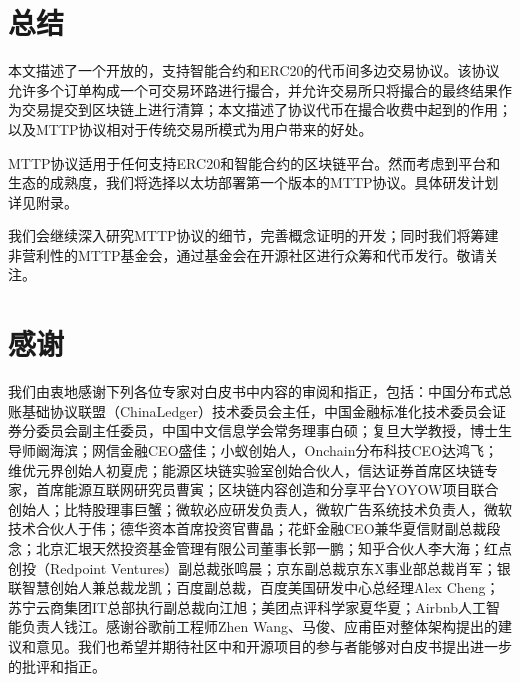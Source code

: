 \documentclass[UTF8,nofonts]{ctexart}
\begin{document}

\section{总结\label{sec:summary}}

本文描述了一个开放的，支持智能合约和ERC20的代币间多边交易协议。该协议允许多个订单构成一个可交易环路进行撮合，并允许交易所只将撮合的最终结果作为交易提交到区块链上进行清算；本文描述了协议代币在撮合收费中起到的作用；以及MTTP协议相对于传统交易所模式为用户带来的好处。

MTTP协议适用于任何支持ERC20和智能合约的区块链平台。然而考虑到平台和生态的成熟度，我们将选择以太坊部署第一个版本的MTTP协议。具体研发计划详见附录。

我们会继续深入研究MTTP协议的细节，完善概念证明的开发；同时我们将筹建非营利性的MTTP基金会，通过基金会在开源社区进行众筹和代币发行。敬请关注。

\section{感谢\label{sec:acknowledgement}}

我们由衷地感谢下列各位专家对白皮书中内容的审阅和指正，包括：中国分布式总账基础协议联盟（ChinaLedger）技术委员会主任，中国金融标准化技术委员会证券分委员会副主任委员，中国中文信息学会常务理事白硕；复旦大学教授，博士生导师阚海滨；网信金融CEO盛佳；小蚁创始人，Onchain分布科技CEO达鸿飞；维优元界创始人初夏虎；能源区块链实验室创始合伙人，信达证券首席区块链专家，首席能源互联网研究员曹寅；区块链内容创造和分享平台YOYOW项目​联合创始人；比特股理事巨蟹；微软必应研发负责人，微软广告系统技术负责人，微软技术合伙人于伟；德华资本首席投资官​曹晶；花虾金融CEO兼华夏信财副总裁段念；北京汇垠天然投资基金管理有限公司董事长郭一鹏；知乎合伙人李大海；红点创投（Redpoint Ventures）副总裁张鸣晨；京东副总裁京东X事业部总裁肖军；银联智慧创始人兼总裁龙凯；百度副总裁，百度美国研发中心总经理Alex Cheng；苏宁云商集团IT总部执行副总裁向江旭；美团点评科学家夏华夏；Airbnb人工智能负责人钱江。感谢谷歌前工程师Zhen Wang、马俊、应甫臣对整体架构提出的建议和意见。我们也希望并期待社区中和开源项目的参与者能够对白皮书提出进一步的批评和指正。

\newpage


\end{document}
